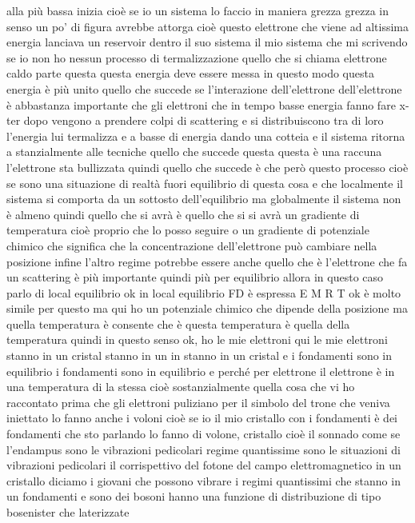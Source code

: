 alla più bassa inizia cioè se io un sistema lo faccio in maniera grezza grezza in senso un po' di figura avrebbe attorga cioè questo elettrone che viene ad altissima energia lanciava un reservoir dentro il suo sistema il mio sistema che mi scrivendo se io non ho nessun processo di termalizzazione quello che si chiama elettrone caldo parte questa questa energia deve essere messa in questo modo questa energia è più unito quello che succede se l'interazione dell'elettrone dell'elettrone è abbastanza importante che gli elettroni che in tempo basse energia fanno fare x-ter dopo vengono a prendere colpi di scattering e si distribuiscono tra di loro l'energia lui termalizza e a basse di energia dando una cotteia e il sistema ritorna a stanzialmente alle tecniche quello che succede questa questa è una raccuna l'elettrone sta bullizzata quindi quello che succede è che però questo processo cioè se sono una situazione di realtà fuori equilibrio di questa cosa e che localmente il sistema si comporta da un sottosto dell'equilibrio ma globalmente il sistema non è almeno quindi quello che si avrà è quello che si si avrà un gradiente di temperatura cioè proprio che lo posso seguire o un gradiente di potenziale chimico che significa che la concentrazione dell'elettrone può cambiare nella posizione infine l'altro regime potrebbe essere anche quello che è l'elettrone che fa un scattering è più importante quindi più per equilibrio allora in questo caso parlo di local equilibrio ok in local equilibrio FD è espressa E M R T ok è molto simile per questo ma qui ho un potenziale chimico che dipende della posizione ma quella temperatura è consente che è questa temperatura è quella della temperatura quindi in questo senso ok, ho le mie elettroni qui le mie elettroni stanno in un cristal stanno in un in stanno in un cristal e i fondamenti sono in equilibrio i fondamenti sono in equilibrio e perché per elettrone il elettrone è in una temperatura di la stessa cioè sostanzialmente quella cosa che vi ho raccontato prima che gli elettroni puliziano per il simbolo del trone che veniva iniettato lo fanno anche i voloni cioè se io il mio cristallo con i fondamenti è dei fondamenti che sto parlando lo fanno di volone, cristallo cioè il sonnado come se l'endampus sono le vibrazioni pedicolari regime quantissime sono le situazioni di vibrazioni pedicolari il corrispettivo del fotone del campo elettromagnetico in un cristallo diciamo i giovani che possono vibrare i regimi quantissimi che stanno in un fondamenti e sono dei bosoni hanno una funzione di distribuzione di tipo bosenister che laterizzate 

